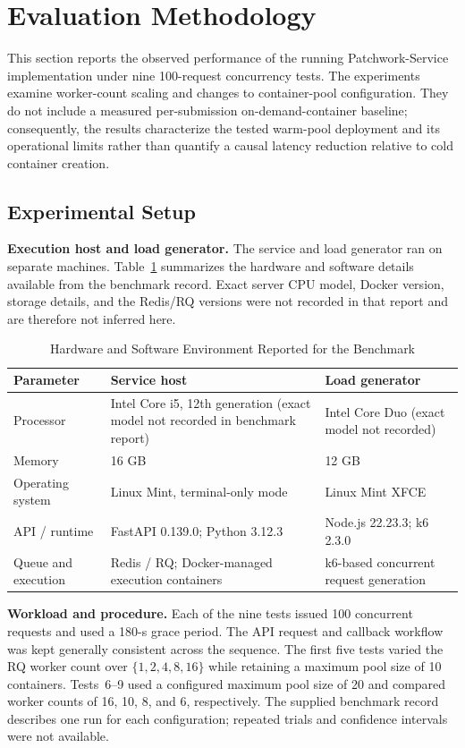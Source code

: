 \section{Evaluation Methodology}
This section reports the observed performance of the running Patchwork-Service implementation under nine 100-request concurrency tests. The experiments examine worker-count scaling and changes to container-pool configuration. They do not include a measured per-submission on-demand-container baseline; consequently, the results characterize the tested warm-pool deployment and its operational limits rather than quantify a causal latency reduction relative to cold container creation.

\subsection{Experimental Setup}
\textbf{Execution host and load generator.} The service and load generator ran on separate machines. Table~\ref{tab:environment} summarizes the hardware and software details available from the benchmark record. Exact server CPU model, Docker version, storage details, and the Redis/RQ versions were not recorded in that report and are therefore not inferred here.

\begin{table}[t]
\centering
\caption{Hardware and Software Environment Reported for the Benchmark}
\label{tab:environment}
\renewcommand{\arraystretch}{1.12}
\setlength{\tabcolsep}{5pt}
\begin{tabular}{p{}p{}p{}}
\toprule
\textbf{Parameter} & \textbf{Service host} & \textbf{Load generator} \\
\midrule
Processor & Intel Core i5, 12th generation (exact model not recorded in benchmark report) & Intel Core Duo (exact model not recorded) \\
Memory & 16 GB & 12 GB \\
Operating system & Linux Mint, terminal-only mode & Linux Mint XFCE \\
API / runtime & FastAPI 0.139.0; Python 3.12.3 & Node.js 22.23.3; k6 2.3.0 \\
Queue and execution & Redis / RQ; Docker-managed execution containers & k6-based concurrent request generation \\
\bottomrule
\end{tabular}
\end{table}

\textbf{Workload and procedure.} Each of the nine tests issued 100 concurrent requests and used a 180-s grace period. The API request and callback workflow was kept generally consistent across the sequence. The first five tests varied the RQ worker count over $\{1,2,4,8,16\}$ while retaining a maximum pool size of 10 containers. Tests~6--9 used a configured maximum pool size of 20 and compared worker counts of 16, 10, 8, and 6, respectively. The supplied benchmark record describes one run for each configuration; repeated trials and confidence intervals were not available.

